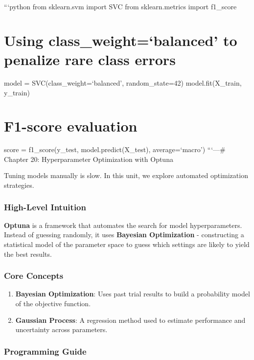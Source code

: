 ```python from sklearn.svm import SVC from sklearn.metrics import
f1\_score

\section{Using class\_weight=`balanced' to penalize rare class
errors}\label{using-class_weightbalanced-to-penalize-rare-class-errors}

model = SVC(class\_weight=`balanced', random\_state=42)
model.fit(X\_train, y\_train)

\section{F1-score evaluation}\label{f1-score-evaluation}

score = f1\_score(y\_test, model.predict(X\_test), average=`macro')
```\n\n---\n\n\# Chapter 20: Hyperparameter Optimization with Optuna

Tuning models manually is slow. In this unit, we explore automated
optimization strategies.

\subsubsection{High-Level Intuition}\label{high-level-intuition-19}

\textbf{Optuna} is a framework that automates the search for model
hyperparameters. Instead of guessing randomly, it uses \textbf{Bayesian
Optimization} - constructing a statistical model of the parameter space
to guess which settings are likely to yield the best results.

\subsubsection{Core Concepts}\label{core-concepts-12}

\begin{enumerate}
\def\labelenumi{\arabic{enumi}.}
\tightlist
\item
  \textbf{Bayesian Optimization}: Uses past trial results to build a
  probability model of the objective function.
\item
  \textbf{Gaussian Process}: A regression method used to estimate
  performance and uncertainty across parameters.
\end{enumerate}

\subsubsection{Programming Guide}\label{programming-guide-19}


